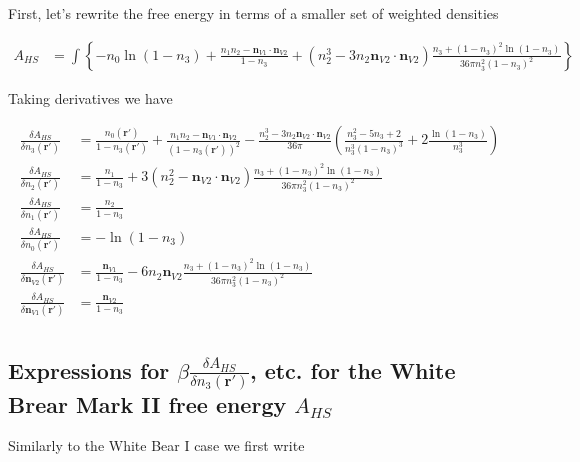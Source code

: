 \documentclass[letterpaper,twocolumn,amsmath,amssymb,jcp,10pt,aip]{revtex4-1}
\begin{document}
\begin{widetext}
  First, let's rewrite the free energy in terms of a smaller set of weighted densities
  
  \begin{align}
    A_{HS} &= \int \left\{
    -n_0 \ln\left( 1 - n_3\right)
    + \frac{n_1 n_2 - \mathbf{n}_{V1} \cdot\mathbf{n}_{V2}}{1-n_3}
    + (n_2^3 - 3 n_2 \mathbf{n}_{V2} \cdot \mathbf{n}_{V2}) \frac{
      n_3 + (1-n_3)^2 \ln(1-n_3)
    }{
      36\pi n_3^2(1-n_3)^2
    }
    \right\}
  \end{align}
  
Taking derivatives we have

  \begin{align}
    \frac{\delta A_{HS}}{\delta n_3(\mathbf{r}')} &=
    \frac{n_0(\mathbf{r}')}{1 - n_3(\mathbf{r}')}
    + \frac{n_1n_2 - \mathbf{n}_{V1}\cdot\mathbf{n}_{V2}}{(1 -
      n_3(\mathbf{r}'))^2}
    - \frac{n_2^3 -
      3n_2\mathbf{n}_{V2}\cdot\mathbf{n}_{V2}}{36\pi}\left(
    \frac{n_3^2-5n_3+2}{n_3^3(1-n_3)^3} + 2\frac{\ln(1-n_3)}{n_3^3}
    \right)
    \\
    \frac{\delta A_{HS}}{\delta n_2(\mathbf{r}')} &=
    \frac{n_1}{1-n_3}
    + 3(n_2^2 - \mathbf{n}_{V2}\cdot\mathbf{n}_{V2})\frac{n_3 +
      (1-n_3)^2\ln(1-n_3)}{
      36\pi n_3^2(1-n_3)^2
    }
    \\
    \frac{\delta A_{HS}}{\delta n_1(\mathbf{r}')} &= \frac{n_2}{1-n_3}
    \\
    \frac{\delta A_{HS}}{\delta n_0(\mathbf{r}')} &=
    -\ln\left( 1 - n_3\right) \\
    \frac{\delta A_{HS}}{\delta \mathbf{n}_{V2}(\mathbf{r}')} &=
    \frac{\mathbf{n}_{V1}}{1-n_3}
    - 6 n_2 \mathbf{n}_{V2} \frac{n_3 +
      (1-n_3)^2\ln(1-n_3)}{
      36\pi n_3^2(1-n_3)^2
    }    \\
    \frac{\delta A_{HS}}{\delta \mathbf{n}_{V1}(\mathbf{r}')} &=
    \frac{\mathbf{n}_{V2}}{1-n_3} \\
  \end{align}


\subsection{Expressions for $\beta\frac{\delta A_{HS}}{\delta n_3(\mathbf{r}')}$, etc. for the White Brear Mark II free energy $A_{HS}$}

Similarly to the White Bear I case we first write


\end{widetext}
\end{document}
